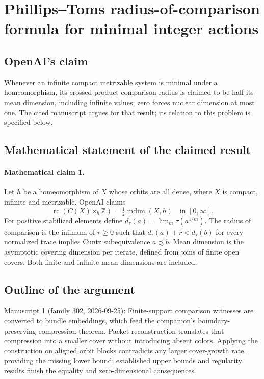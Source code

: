\documentclass[11pt]{article}
\begin{document}
\section*{Phillips–Toms radius-of-comparison formula for minimal integer actions}

\subsection{OpenAI's claim}
Whenever an infinite compact metrizable system is minimal under a homeomorphism, its crossed-product comparison radius is claimed to be half its mean dimension, including infinite values; zero forces nuclear dimension at most one. The cited manuscript argues for that result; its relation to this problem is specified below.

\subsection{Mathematical statement of the claimed result}
\paragraph{Mathematical claim 1.} Let $h$ be a homeomorphism of $X$ whose orbits are all dense, where $X$ is compact, infinite and metrizable. OpenAI claims
\[
\operatorname{rc}(C(X)\rtimes_h\mathbb Z)=\tfrac12\operatorname{mdim}(X,h)\quad\text{in }[0,\infty].
\]
For positive stabilized elements define $d_\tau(a)=\lim_m\tau(a^{1/m})$. The radius of comparison is the infimum of $r\ge0$ such that $d_\tau(a)+r<d_\tau(b)$ for every normalized trace implies Cuntz subequivalence $a\precsim b$. Mean dimension is the asymptotic covering dimension per iterate, defined from joins of finite open covers. Both finite and infinite mean dimensions are included.

\subsection{Outline of the argument}
Manuscript 1 (family 302, 2026-09-25): Finite-support comparison witnesses are converted to bundle embeddings, which feed the companion's boundary-preserving compression theorem. Packet reconstruction translates that compression into a smaller cover without introducing absent colors. Applying the construction on aligned orbit blocks contradicts any larger cover-growth rate, providing the missing lower bound; established upper bounds and regularity results finish the equality and zero-dimensional consequences.
\end{document}
